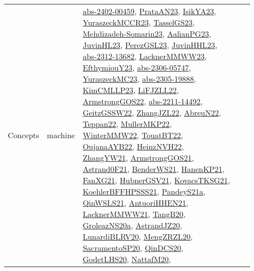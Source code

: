 {\begin{longtable}{lp{3cm}>{\raggedright}p{6cm}>{\raggedright}p{6cm}p{8cm}}
Concepts & machine & \href{articles/abs-2402-00459.pdf}{abs-2402-00459}\cite{abs-2402-00459}, \href{articles/PrataAN23.pdf}{PrataAN23}\cite{PrataAN23}, \href{articles/IsikYA23.pdf}{IsikYA23}\cite{IsikYA23}, \href{articles/YuraszeckMCCR23.pdf}{YuraszeckMCCR23}\cite{YuraszeckMCCR23}, \href{papers/TasselGS23.pdf}{TasselGS23}\cite{TasselGS23}, \href{papers/Mehdizadeh-Somarin23.pdf}{Mehdizadeh-Somarin23}\cite{Mehdizadeh-Somarin23}, \href{papers/AalianPG23.pdf}{AalianPG23}\cite{AalianPG23}, \href{papers/JuvinHL23.pdf}{JuvinHL23}\cite{JuvinHL23}, \href{papers/PerezGSL23.pdf}{PerezGSL23}\cite{PerezGSL23}, \href{papers/JuvinHHL23.pdf}{JuvinHHL23}\cite{JuvinHHL23}, \href{articles/abs-2312-13682.pdf}{abs-2312-13682}\cite{abs-2312-13682}, \href{articles/LacknerMMWW23.pdf}{LacknerMMWW23}\cite{LacknerMMWW23}, \href{papers/EfthymiouY23.pdf}{EfthymiouY23}\cite{EfthymiouY23}, \href{articles/abs-2306-05747.pdf}{abs-2306-05747}\cite{abs-2306-05747}, \href{papers/YuraszeckMC23.pdf}{YuraszeckMC23}\cite{YuraszeckMC23}, \href{articles/abs-2305-19888.pdf}{abs-2305-19888}\cite{abs-2305-19888}, \href{papers/KimCMLLP23.pdf}{KimCMLLP23}\cite{KimCMLLP23}, \href{papers/LiFJZLL22.pdf}{LiFJZLL22}\cite{LiFJZLL22}, \href{papers/ArmstrongGOS22.pdf}{ArmstrongGOS22}\cite{ArmstrongGOS22}, \href{articles/abs-2211-14492.pdf}{abs-2211-14492}\cite{abs-2211-14492}, \href{papers/GeitzGSSW22.pdf}{GeitzGSSW22}\cite{GeitzGSSW22}, \href{papers/ZhangJZL22.pdf}{ZhangJZL22}\cite{ZhangJZL22}, \href{articles/AbreuN22.pdf}{AbreuN22}\cite{AbreuN22}, \href{papers/Teppan22.pdf}{Teppan22}\cite{Teppan22}, \href{articles/MullerMKP22.pdf}{MullerMKP22}\cite{MullerMKP22}, \href{papers/WinterMMW22.pdf}{WinterMMW22}\cite{WinterMMW22}, \href{papers/TouatBT22.pdf}{TouatBT22}\cite{TouatBT22}, \href{papers/OujanaAYB22.pdf}{OujanaAYB22}\cite{OujanaAYB22}, \href{articles/HeinzNVH22.pdf}{HeinzNVH22}\cite{HeinzNVH22}, \href{articles/ZhangYW21.pdf}{ZhangYW21}\cite{ZhangYW21}, \href{papers/ArmstrongGOS21.pdf}{ArmstrongGOS21}\cite{ArmstrongGOS21}, \href{papers/Astrand0F21.pdf}{Astrand0F21}\cite{Astrand0F21}, \href{papers/BenderWS21.pdf}{BenderWS21}\cite{BenderWS21}, \href{papers/HanenKP21.pdf}{HanenKP21}\cite{HanenKP21}, \href{articles/FanXG21.pdf}{FanXG21}\cite{FanXG21}, \href{articles/HubnerGSV21.pdf}{HubnerGSV21}\cite{HubnerGSV21}, \href{papers/KovacsTKSG21.pdf}{KovacsTKSG21}\cite{KovacsTKSG21}, \href{articles/KoehlerBFFHPSSS21.pdf}{KoehlerBFFHPSSS21}\cite{KoehlerBFFHPSSS21}, \href{articles/PandeyS21a.pdf}{PandeyS21a}\cite{PandeyS21a}, \href{articles/QinWSLS21.pdf}{QinWSLS21}\cite{QinWSLS21}, \href{papers/AntuoriHHEN21.pdf}{AntuoriHHEN21}\cite{AntuoriHHEN21}, \href{papers/LacknerMMWW21.pdf}{LacknerMMWW21}\cite{LacknerMMWW21}, \href{papers/TangB20.pdf}{TangB20}\cite{TangB20}, \href{papers/GroleazNS20a.pdf}{GroleazNS20a}\cite{GroleazNS20a}, \href{articles/AstrandJZ20.pdf}{AstrandJZ20}\cite{AstrandJZ20}, \href{articles/LunardiBLRV20.pdf}{LunardiBLRV20}\cite{LunardiBLRV20}, \href{articles/MengZRZL20.pdf}{MengZRZL20}\cite{MengZRZL20}, \href{articles/SacramentoSP20.pdf}{SacramentoSP20}\cite{SacramentoSP20}, \href{articles/QinDCS20.pdf}{QinDCS20}\cite{QinDCS20}, \href{papers/GodetLHS20.pdf}{GodetLHS20}\cite{GodetLHS20}, \href{papers/NattafM20.pdf}{NattafM20}\cite{NattafM20}, 
\end{longtable}}
